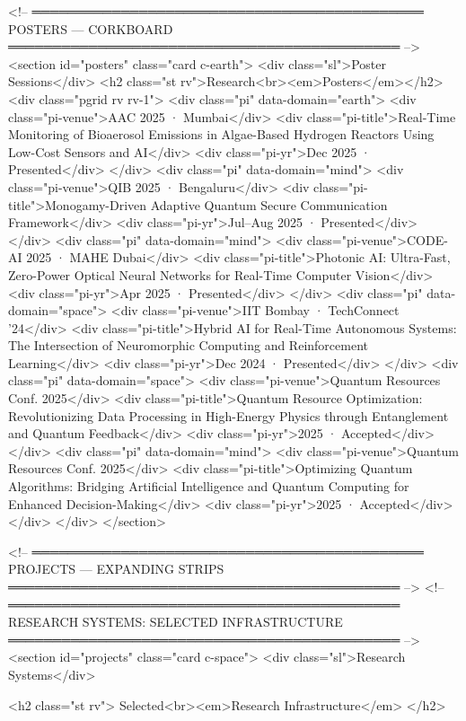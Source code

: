 <!-- ════════════════════════════════════════════
     POSTERS — CORKBOARD
════════════════════════════════════════════ -->
<section id="posters" class="card c-earth">
  <div class="sl">Poster Sessions</div>
  <h2 class="st rv">Research<br><em>Posters</em></h2>
  <div class="pgrid rv rv-1">
    <div class="pi" data-domain="earth">
      <div class="pi-venue">AAC 2025 · Mumbai</div>
      <div class="pi-title">Real-Time Monitoring of Bioaerosol Emissions in Algae-Based Hydrogen Reactors Using Low-Cost Sensors and AI</div>
      <div class="pi-yr">Dec 2025 · Presented</div>
    </div>
    <div class="pi" data-domain="mind">
      <div class="pi-venue">QIB 2025 · Bengaluru</div>
      <div class="pi-title">Monogamy-Driven Adaptive Quantum Secure Communication Framework</div>
      <div class="pi-yr">Jul–Aug 2025 · Presented</div>
    </div>
    <div class="pi" data-domain="mind">
      <div class="pi-venue">CODE-AI 2025 · MAHE Dubai</div>
      <div class="pi-title">Photonic AI: Ultra-Fast, Zero-Power Optical Neural Networks for Real-Time Computer Vision</div>
      <div class="pi-yr">Apr 2025 · Presented</div>
    </div>
    <div class="pi" data-domain="space">
      <div class="pi-venue">IIT Bombay · TechConnect '24</div>
      <div class="pi-title">Hybrid AI for Real-Time Autonomous Systems: The Intersection of Neuromorphic Computing and Reinforcement Learning</div>
      <div class="pi-yr">Dec 2024 · Presented</div>
    </div>
    <div class="pi" data-domain="space">
      <div class="pi-venue">Quantum Resources Conf. 2025</div>
      <div class="pi-title">Quantum Resource Optimization: Revolutionizing Data Processing in High-Energy Physics through Entanglement and Quantum Feedback</div>
      <div class="pi-yr">2025 · Accepted</div>
    </div>
    <div class="pi" data-domain="mind">
      <div class="pi-venue">Quantum Resources Conf. 2025</div>
      <div class="pi-title">Optimizing Quantum Algorithms: Bridging Artificial Intelligence and Quantum Computing for Enhanced Decision-Making</div>
      <div class="pi-yr">2025 · Accepted</div>
    </div>
  </div>
</section>

<!-- ════════════════════════════════════════════
     PROJECTS — EXPANDING STRIPS
════════════════════════════════════════════ -->
<!-- ════════════════════════════════════════════
     RESEARCH SYSTEMS: SELECTED INFRASTRUCTURE
════════════════════════════════════════════ -->
<section id="projects" class="card c-space">
  <div class="sl">Research Systems</div>

  <h2 class="st rv">
    Selected<br><em>Research Infrastructure</em>
  </h2>

